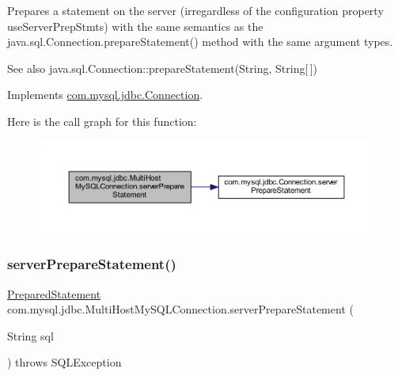 Prepares a statement on the server (irregardless of the configuration property \textquotesingle{}use\+Server\+Prep\+Stmts\textquotesingle{}) with the same semantics as the java.\+sql.\+Connection.\+prepare\+Statement() method with the same argument types.

\begin{DoxySeeAlso}{See also}
java.\+sql.\+Connection\+::prepare\+Statement(\+String, String\mbox{[}$\,$\mbox{]}) 
\end{DoxySeeAlso}


Implements \mbox{\hyperlink{interfacecom_1_1mysql_1_1jdbc_1_1_connection_a7bbac014ef6bb3ad113c039f71af4bd9}{com.\+mysql.\+jdbc.\+Connection}}.

Here is the call graph for this function\+:
\nopagebreak
\begin{figure}[H]
\begin{center}
\leavevmode
\includegraphics[width=350pt]{classcom_1_1mysql_1_1jdbc_1_1_multi_host_my_s_q_l_connection_a406fc0eb56f50ed44dc36158ab45e8d0_cgraph}
\end{center}
\end{figure}
\mbox{\label{classcom_1_1mysql_1_1jdbc_1_1_multi_host_my_s_q_l_connection_a7a111a6315de5d2c9b08f5e4d4f84fed}} 
\subsubsection{\texorpdfstring{server\+Prepare\+Statement()}{serverPrepareStatement()}\hspace{0.1cm}{\footnotesize\ttfamily [6/6]}}
{\footnotesize\ttfamily \mbox{\hyperlink{classcom_1_1mysql_1_1jdbc_1_1_prepared_statement}{Prepared\+Statement}} com.\+mysql.\+jdbc.\+Multi\+Host\+My\+S\+Q\+L\+Connection.\+server\+Prepare\+Statement (\begin{DoxyParamCaption}\item[{String}]{sql }\end{DoxyParamCaption}) throws S\+Q\+L\+Exception}

